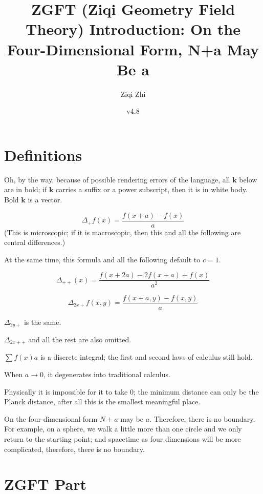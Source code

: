 \documentclass[UTF8]{article}
\title{\textbf{ZGFT (Ziqi Geometry Field Theory) Introduction: On the Four-Dimensional Form, N+a May Be a}}
\author{Ziqi Zhi}
\date{v4.8}
\begin{document}
\maketitle

\section{Definitions}

Oh, by the way, because of possible rendering errors of the language, all \(\mathbf{k}\) below are in bold; if \(\mathbf{k}\) carries a suffix or a power subscript, then it is in white body. Bold \(\mathbf{k}\) is a vector.

\begin{equation}
\Delta_+ f(x)=\frac{f(x+a)-f(x)}{a}
\end{equation}
(This is microscopic; if it is macroscopic, then this and all the following are central differences.)

At the same time, this formula and all the following default to \(c=1\).

\begin{equation}
\Delta_{++}(x)=\frac{f(x+2a)-2f(x+a)+f(x)}{a^2}
\end{equation}

\begin{equation}
\Delta_{2x+}f(x,y)=\frac{f(x+a,y)-f(x,y)}{a}
\end{equation}

\(\Delta_{2y+}\) is the same.

\(\Delta_{2x++}\) and all the rest are also omitted.

\(\sum f(x)a\) is a discrete integral; the first and second laws of calculus still hold.

When \(a\to 0\), it degenerates into traditional calculus.

Physically it is impossible for it to take 0; the minimum distance can only be the Planck distance, after all this is the smallest meaningful place.

On the four-dimensional form \(N+a\) may be \(a\). Therefore, there is no boundary. For example, on a sphere, we walk a little more than one circle and we only return to the starting point; and spacetime as four dimensions will be more complicated, therefore, there is no boundary.

\section{ZGFT Part}
\end{document}
